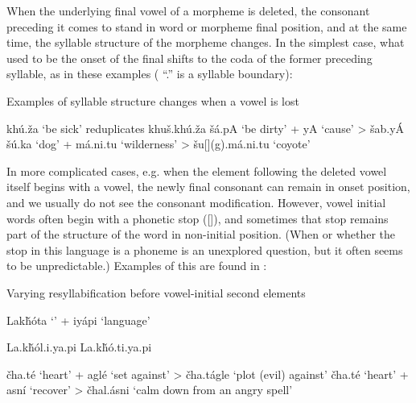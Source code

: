 \documentclass[output=paper]{LSP/langsci}
\begin{document}
When the underlying final vowel of a morpheme is deleted, the consonant preceding it comes to stand in word or morpheme final position, and at the same time, the syllable structure of the morpheme changes. In the simplest case, what used to be the onset of the final shifts to the coda of the former preceding syllable, as in these examples ( ``.'' is a syllable boundary):

\begin{exe}
\ex\label{ex:rood:12} Examples of syllable structure changes when a vowel is lost
\begin{xlist}
\ex kh\'u.\v{z}a `be sick' reduplicates khu\v{s}.kh\'u.\v{z}a
\ex \v{s}\'a.pA `be dirty' + yA `cause' > \v{s}ab.y\'A
\ex \v{s}\'u.ka `dog' + m\'a.ni.tu `wilderness' > \v{s}u[](g).m\'a.ni.tu `coyote'
\end{xlist}
\end{exe}

In more complicated cases, e.g. when the element following the deleted vowel itself begins with a vowel, the newly final consonant can remain in onset position, and we usually do not see the consonant modification. However, vowel initial words often begin with a phonetic  stop ([]), and sometimes that  stop remains part of the structure of the word in non-initial position. (When or whether the  stop in this language is a phoneme is an unexplored question, but it often seems to be unpredictable.) Examples of this are found in :

\begin{exe}
\ex \label{ex:rood:13}Varying resyllabification before vowel-initial second elements
\begin{xlist}
\ex Lak\v{h}\'ota `' + iy\'api `language'
\begin{xlist}
\ex La.k\v{h}\'ol.i.ya.pi
\ex La.k\v{h}\'o.ti.ya.pi
\end{xlist}
\ex 
\begin{xlist}
\ex \v{c}ha.t\'e `heart' + agl\'e `set against' > \v{c}ha.t\'agle `plot (evil) against'
\ex \v{c}ha.t\'e `heart' + asn\'i `recover' > \v{c}hal.\'asni `calm down from an angry spell'
\end{xlist}
\end{xlist}
\end{exe}
\end{document}
